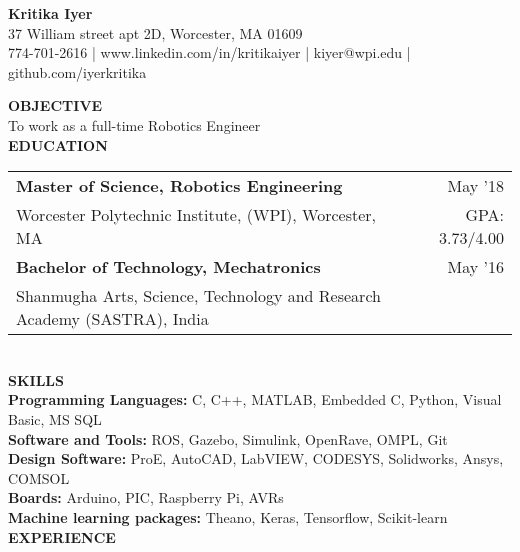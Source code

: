 \documentclass[10pt,a4paper]{article}
\begin{document}
\begin{center}
\textbf{\Large{Kritika Iyer}}\\
37 William street apt 2D, Worcester, MA 01609\\
774-701-2616 | www.linkedin.com/in/kritikaiyer | kiyer@wpi.edu | github.com/iyerkritika\\
\end{center}
\textbf{OBJECTIVE} \\
To work as a full-time Robotics Engineer \\[1\baselineskip]
\textbf{EDUCATION}\\
\begin{tabular}{p{} r}
\textbf{Master of Science, Robotics Engineering} & May '18 \\
Worcester Polytechnic Institute, (WPI), Worcester, MA & GPA: 3.73/4.00 \\[1ex]
\textbf{Bachelor of Technology, Mechatronics} & May '16 \\
Shanmugha Arts, Science, Technology  and Research Academy (SASTRA), India
\end{tabular}
\\[1\baselineskip]
\textbf{SKILLS}\\
\textbf{Programming Languages:} C, C++, MATLAB, Embedded C, Python, Visual Basic, MS SQL\\
\textbf{Software and Tools:} ROS, Gazebo, Simulink, OpenRave, OMPL, Git\\
\textbf{Design Software:} ProE, AutoCAD, LabVIEW, CODESYS, Solidworks, Ansys, COMSOL\\
\textbf{Boards:} Arduino, PIC, Raspberry Pi, AVRs\\
\textbf{Machine learning packages:} Theano, Keras, Tensorflow, Scikit-learn\\[1\baselineskip]
\textbf{EXPERIENCE}\\
\end{document}
